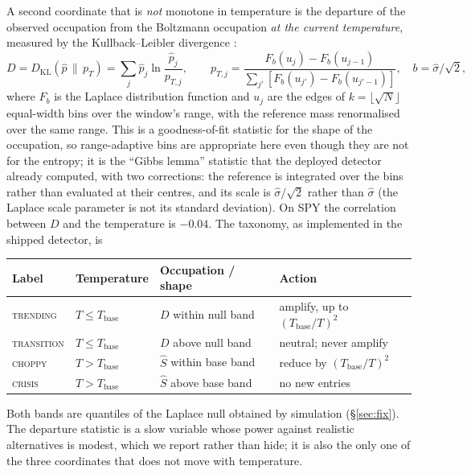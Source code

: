 \documentclass[11pt]{article}
\newcommand{\KL}{D_{\mathrm{KL}}}
\newcommand{\Tb}{T_{\mathrm{base}}}
\begin{document}
A second coordinate that is \emph{not} monotone in temperature is the departure of the observed occupation from the Boltzmann occupation \emph{at the current temperature}, measured by the Kullback--Leibler divergence \citep{kullback1951}:
\begin{equation}
D=\KL(\hat p\,\|\,p_T)=\sum_{j}\hat p_j\ln\frac{\hat p_j}{p_{T,j}},\qquad p_{T,j}=\frac{F_{b}(u_j)-F_{b}(u_{j-1})}{\sum_{j'}\left[F_{b}(u_{j'})-F_{b}(u_{j'-1})\right]},\quad b=\hat\sigma/\sqrt2, \label{eq:kl}
\end{equation}
where $F_b$ is the Laplace distribution function and $u_j$ are the edges of $k=\lfloor\sqrt N\rfloor$ equal-width bins over the window's range, with the reference mass renormalised over the same range. This is a goodness-of-fit statistic for the shape of the occupation, so range-adaptive bins are appropriate here even though they are not for the entropy; it is the ``Gibbs lemma'' statistic that the deployed detector already computed, with two corrections: the reference is integrated over the bins rather than evaluated at their centres, and its scale is $\hat\sigma/\sqrt2$ rather than $\hat\sigma$ (the Laplace scale parameter is not its standard deviation). On SPY the correlation between $D$ and the temperature is $-0.04$. The taxonomy, as implemented in the shipped detector, is
\begin{center}
\begin{tabular}{llll}
\toprule
Label & Temperature & Occupation / shape & Action \\
\midrule
\textsc{trending} & $T\le\Tb$ & $D$ within null band & amplify, up to $(\Tb/T)^2$ \\
\textsc{transition} & $T\le\Tb$ & $D$ above null band & neutral; never amplify \\
\textsc{choppy} & $T>\Tb$ & $\hat S$ within base band & reduce by $(\Tb/T)^2$ \\
\textsc{crisis} & $T>\Tb$ & $\hat S$ above base band & no new entries \\
\bottomrule
\end{tabular}
\end{center}
Both bands are quantiles of the Laplace null obtained by simulation (\S\ref{sec:fix}). The departure statistic is a slow variable whose power against realistic alternatives is modest, which we report rather than hide; it is also the only one of the three coordinates that does not move with temperature.
\end{document}
